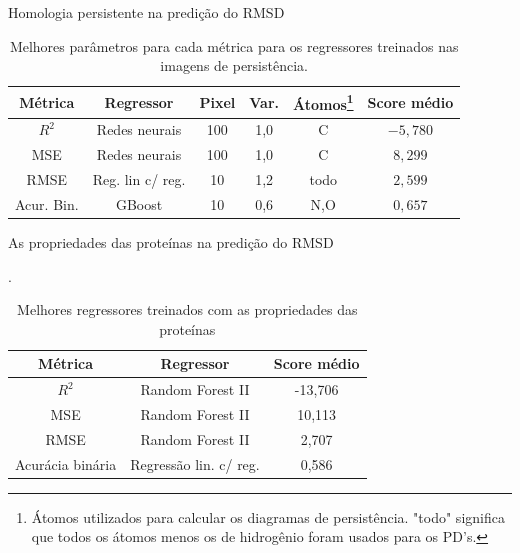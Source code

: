 \documentclass[10pt]{beamer}
\begin{document}
\begin{frame}{Homologia persistente na predição do RMSD}
    \begin{table}[!htbp]
     \centering
     \caption{Melhores parâmetros para cada métrica para os regressores treinados nas imagens de persistência.}
     \label{tab:bestruns}
     \begin{tabular}{@{}cccccc@{}}
     \toprule
     \textbf{Métrica} & \textbf{Regressor} & \textbf{Pixel} & \textbf{Var.} &
     \textbf{Átomos}\footnote{Átomos utilizados para calcular os diagramas de persistência. "todo" significa
     que todos os átomos menos os de hidrogênio foram usados para os PD's.}
      & Score médio
     \\
     \midrule
     $R^2$           & Redes neurais     & 100       & 1,0             & C     & $-5,780$ \\
     MSE             & Redes neurais     & 100       & 1,0             & C     &  $8,299$  \\
     RMSE            & Reg. lin c/ reg.   & 10    & 1,2           & todo  &  $2,599$  \\
         Acur. Bin. & GBoost             & 10      & 0,6             & N,O   &  $0,657$  \\
     \bottomrule
     \end{tabular}
\end{table}
\end{frame}

\begin{frame}{As propriedades das proteínas na predição do RMSD}
\begin{table}[!htbp]
    \centering
    \caption{Melhores regressores treinados com as propriedades das proteínas}.
    \label{tab:rosregr}
    \begin{tabular}{@{}ccc@{}}
        \toprule
        \textbf{Métrica} & \textbf{Regressor} & \textbf{Score médio} \\ \midrule
        $R^2$           & Random Forest II       &-13,706        \\
        MSE             & Random Forest II       & 10,113         \\
        RMSE            & Random Forest II        & 2,707          \\
        Acurácia binária & Regressão lin. c/ reg. & 0,586          \\ \bottomrule
    \end{tabular}
\end{table}
\end{frame}
\end{document}
